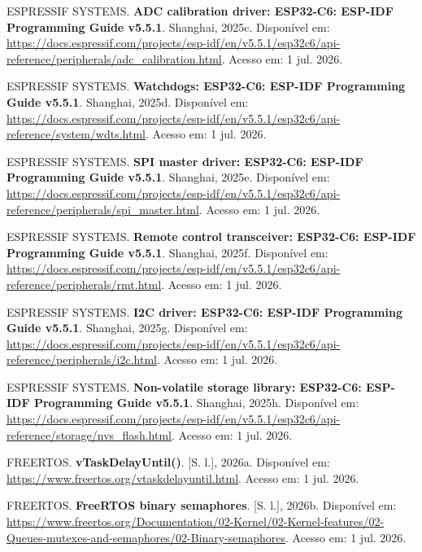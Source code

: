 \documentclass[a4paper,12pt]{article}
\begin{document}
\noindent ESPRESSIF SYSTEMS. \textbf{ADC calibration driver: ESP32-C6: ESP-IDF Programming Guide v5.5.1}. Shanghai, 2025c. Disponível em: \url{https://docs.espressif.com/projects/esp-idf/en/v5.5.1/esp32c6/api-reference/peripherals/adc_calibration.html}. Acesso em: 1 jul. 2026.\par\medskip

\noindent ESPRESSIF SYSTEMS. \textbf{Watchdogs: ESP32-C6: ESP-IDF Programming Guide v5.5.1}. Shanghai, 2025d. Disponível em: \url{https://docs.espressif.com/projects/esp-idf/en/v5.5.1/esp32c6/api-reference/system/wdts.html}. Acesso em: 1 jul. 2026.\par\medskip

\noindent ESPRESSIF SYSTEMS. \textbf{SPI master driver: ESP32-C6: ESP-IDF Programming Guide v5.5.1}. Shanghai, 2025e. Disponível em: \url{https://docs.espressif.com/projects/esp-idf/en/v5.5.1/esp32c6/api-reference/peripherals/spi_master.html}. Acesso em: 1 jul. 2026.\par\medskip

\noindent ESPRESSIF SYSTEMS. \textbf{Remote control transceiver: ESP32-C6: ESP-IDF Programming Guide v5.5.1}. Shanghai, 2025f. Disponível em: \url{https://docs.espressif.com/projects/esp-idf/en/v5.5.1/esp32c6/api-reference/peripherals/rmt.html}. Acesso em: 1 jul. 2026.\par\medskip

\noindent ESPRESSIF SYSTEMS. \textbf{I2C driver: ESP32-C6: ESP-IDF Programming Guide v5.5.1}. Shanghai, 2025g. Disponível em: \url{https://docs.espressif.com/projects/esp-idf/en/v5.5.1/esp32c6/api-reference/peripherals/i2c.html}. Acesso em: 1 jul. 2026.\par\medskip

\noindent ESPRESSIF SYSTEMS. \textbf{Non-volatile storage library: ESP32-C6: ESP-IDF Programming Guide v5.5.1}. Shanghai, 2025h. Disponível em: \url{https://docs.espressif.com/projects/esp-idf/en/v5.5.1/esp32c6/api-reference/storage/nvs_flash.html}. Acesso em: 1 jul. 2026.\par\medskip

\noindent FREERTOS. \textbf{vTaskDelayUntil()}. [S. l.], 2026a. Disponível em: \url{https://www.freertos.org/vtaskdelayuntil.html}. Acesso em: 1 jul. 2026.\par\medskip

\noindent FREERTOS. \textbf{FreeRTOS binary semaphores}. [S. l.], 2026b. Disponível em: \url{https://www.freertos.org/Documentation/02-Kernel/02-Kernel-features/02-Queues-mutexes-and-semaphores/02-Binary-semaphores}. Acesso em: 1 jul. 2026.\par\medskip
\end{document}
